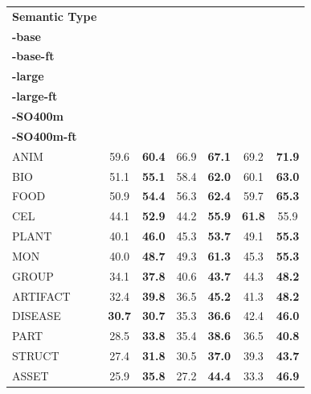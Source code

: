 \documentclass[11pt]{article}
\begin{document}
\begin{table}[t!]
\centering
\setlength{\tabcolsep}{9pt}
\begin{tabularx}{\textwidth}{l|cc|cc|cc}
\toprule
\textbf{Semantic Type} & 
\makecell{\textbf{SigLIP} \\ \textbf{-base}} & 
\makecell{\textbf{SigLIP} \\ \textbf{-base-ft}} & 
\makecell{\textbf{SigLIP} \\ \textbf{-large}} & 
\makecell{\textbf{SigLIP} \\ \textbf{-large-ft}} & 
\makecell{\textbf{SigLIP} \\ \textbf{-SO400m}} & 
\makecell{\textbf{SigLIP} \\ \textbf{-SO400m-ft}} \\
\midrule
ANIM    & 59.6 & \textbf{60.4} & 66.9 & \textbf{67.1} & 69.2 & \textbf{71.9} \\
BIO     & 51.1 & \textbf{55.1} & 58.4 & \textbf{62.0} & 60.1 & \textbf{63.0} \\
FOOD    & 50.9 & \textbf{54.4} & 56.3 & \textbf{62.4} & 59.7 & \textbf{65.3} \\
CEL     & 44.1 & \textbf{52.9} & 44.2 & \textbf{55.9} & \textbf{61.8} & 55.9
\\
PLANT   & 40.1 & \textbf{46.0} & 45.3 & \textbf{53.7} & 49.1 & \textbf{55.3}
\\
MON     & 40.0 & \textbf{48.7} & 49.3 & \textbf{61.3} & 45.3 & \textbf{55.3}
\\
GROUP   & 34.1 & \textbf{37.8} & 40.6 & \textbf{43.7} & 44.3 & \textbf{48.2}
\\
ARTIFACT & 32.4 & \textbf{39.8} & 36.5 & \textbf{45.2} & 41.3 & \textbf{48.2}
\\
DISEASE  & \textbf{30.7} & \textbf{30.7} & 35.3 & \textbf{36.6} & 42.4 & \textbf{46.0}
\\
PART     & 28.5 & \textbf{33.8} & 35.4 & \textbf{38.6} & 36.5 & \textbf{40.8}
\\
STRUCT   & 27.4 & \textbf{31.8} & 30.5 & \textbf{37.0} & 39.3 & \textbf{43.7}
\\
ASSET    & 25.9 & \textbf{35.8} & 27.2 & \textbf{44.4} & 33.3 & \textbf{46.9}
\\

\end{tabularx}
\end{table}
\end{document}
